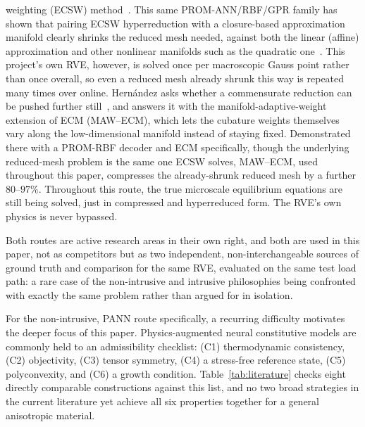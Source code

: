 \documentclass[10pt,a4paper]{article}
\begin{document}
weighting (ECSW) method~\cite{Farhat2014,Farhat2015,Grimberg2021}.
This same PROM-ANN/RBF/GPR family has shown that pairing ECSW
hyperreduction with a closure-based approximation manifold clearly
shrinks the reduced mesh needed, against both the linear (affine)
approximation and other
nonlinear manifolds such as the quadratic
one~\cite{Barnett2022,Barnett2023,Chmiel2024,AresDeParga2026}. This
project's own RVE, however, is solved once per macroscopic Gauss point
rather than once overall, so even a reduced mesh already shrunk this
way is repeated many times over online. Hern\'andez asks whether a
commensurate reduction can be pushed further
still~\cite{HernandezMAWECM}, and answers it with the
manifold-adaptive-weight extension of ECM (MAW--ECM), which lets the
cubature weights themselves vary along the low-dimensional manifold
instead of staying fixed. Demonstrated there with a PROM-RBF decoder
and ECM specifically, though the underlying reduced-mesh problem is
the same one ECSW solves, MAW--ECM, used throughout this paper,
compresses the already-shrunk reduced mesh by a further
$80$--$97\%$. Throughout this route,
the true microscale equilibrium equations are still being solved, just
in compressed and hyperreduced form. The RVE's own physics is never
bypassed.

Both routes are active research areas in their own right, and both are
used in this paper, not as competitors but as two independent,
non-interchangeable sources of ground truth and comparison for the same
RVE, evaluated on the same test load path: a rare case of the
non-intrusive and intrusive philosophies being confronted with exactly
the same problem rather than argued for in isolation.

For the non-intrusive, PANN route specifically, a recurring difficulty
motivates the deeper focus of this paper. Physics-augmented neural constitutive models are commonly held to an
admissibility checklist: (C1) thermodynamic consistency, (C2)
objectivity, (C3) tensor symmetry, (C4) a stress-free reference state, (C5)
polyconvexity, and (C6) a growth condition. Table~\ref{tab:literature}
checks eight directly comparable constructions against this list, and no
two broad strategies in the current literature yet achieve all six
properties together for a general anisotropic material.
\end{document}
